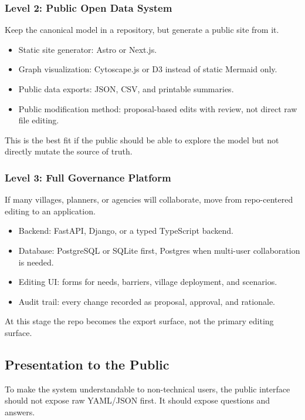 \documentclass[11pt,a4paper]{article}
\begin{document}
\subsubsection{Level 2: Public Open Data System}

Keep the canonical model in a repository, but generate a public site from it.

\begin{itemize}
    \item Static site generator: Astro or Next.js.
    \item Graph visualization: Cytoscape.js or D3 instead of static Mermaid only.
    \item Public data exports: JSON, CSV, and printable summaries.
    \item Public modification method: proposal-based edits with review, not direct raw file editing.
\end{itemize}

This is the best fit if the public should be able to explore the model but not directly mutate the source of truth.

\subsubsection{Level 3: Full Governance Platform}

If many villages, planners, or agencies will collaborate, move from repo-centered editing to an application.

\begin{itemize}
    \item Backend: FastAPI, Django, or a typed TypeScript backend.
    \item Database: PostgreSQL or SQLite first, Postgres when multi-user collaboration is needed.
    \item Editing UI: forms for needs, barriers, village deployment, and scenarios.
    \item Audit trail: every change recorded as proposal, approval, and rationale.
\end{itemize}

At this stage the repo becomes the export surface, not the primary editing surface.

\subsection{Presentation to the Public}

To make the system understandable to non-technical users, the public interface should not expose raw YAML/JSON first. It should expose questions and answers.
\end{document}
